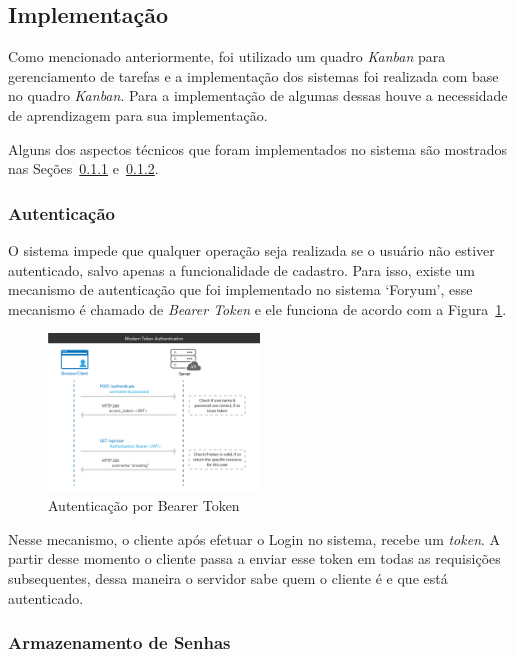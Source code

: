 \documentclass[12pt]{article}
\begin{document}
\subsection{Implementação}

Como mencionado anteriormente, foi utilizado um quadro \textit{Kanban} para gerenciamento
de tarefas e a implementação dos sistemas foi realizada com base no quadro \textit{Kanban}.
Para a implementação de algumas dessas houve a necessidade de aprendizagem para sua implementação.

Alguns dos aspectos técnicos que foram implementados no sistema são mostrados nas
Seções~\ref{Autenticacao} e~\ref{Armazenamento}.

\subsubsection{Autenticação}\label{Autenticacao}

O sistema impede que qualquer operação seja realizada se o usuário não estiver autenticado, salvo
apenas a funcionalidade de cadastro. Para isso, existe um mecanismo de autenticação que foi implementado no
sistema `Foryum', esse mecanismo é chamado de \textit{Bearer Token} e ele funciona de acordo com a Figura~\ref{fig:token}.

\begin{figure}[h]
    \centering
    \includegraphics[width=0.5\textwidth]{security/token-authentication.png}
    \caption{Autenticação por Bearer Token}\label{fig:token}
\end{figure}

Nesse mecanismo, o cliente após efetuar o Login no sistema, recebe um \textit{token}. A partir desse momento
o cliente passa a enviar esse token em todas as requisições subsequentes, dessa maneira o servidor
sabe quem o cliente é e que está autenticado.

\subsubsection{Armazenamento de Senhas}\label{Armazenamento}
\end{document}
